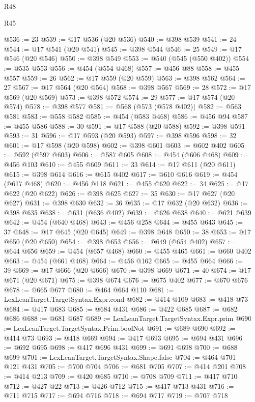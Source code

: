 \begin{lexlean}{R48}
\begin{lexlean}{R45}
\begin{coremodule}
{{{{{{{{{{{{{{{{{{{{{{{{{{{{{{{{{{{{{{{{{{{{{{{{{{{{{{{{{{{{{{{{{{{{{{{{{{{{{{{{{{{{{{{{{{{@536 := 23
@539 := @17 @536 (@20 @536)
@540 := @398 @539
@541 := 24
@544 := @17 @541 (@20 @541)
@545 := @398 @544
@546 := 25
@549 := @17 @546 (@20 @546)
@550 := @398 @549
@553 := @540 (@545 (@550 @402))
@554 := @535 @553
@556 := @454 (@554 @468)
@557 := @456 @88
@558 := @455 @557
@559 := 26
@562 := @17 @559 (@20 @559)
@563 := @398 @562
@564 := 27
@567 := @17 @564 (@20 @564)
@568 := @398 @567
@569 := 28
@572 := @17 @569 (@20 @569)
@573 := @398 @572
@574 := 29
@577 := @17 @574 (@20 @574)
@578 := @398 @577
@581 := @568 (@573 (@578 @402))
@582 := @563 @581
@583 := @558 @582
@585 := @454 (@583 @468)
@586 := @456 @94
@587 := @455 @586
@588 := 30
@591 := @17 @588 (@20 @588)
@592 := @398 @591
@593 := 31
@596 := @17 @593 (@20 @593)
@597 := @398 @596
@598 := 32
@601 := @17 @598 (@20 @598)
@602 := @398 @601
@603 := @602 @402
@605 := @592 (@597 @603)
@606 := @587 @605
@608 := @454 (@606 @468)
@609 := @456 @103
@610 := @455 @609
@611 := 33
@614 := @17 @611 (@20 @611)
@615 := @398 @614
@616 := @615 @402
@617 := @610 @616
@619 := @454 (@617 @468)
@620 := @456 @118
@621 := @455 @620
@622 := 34
@625 := @17 @622 (@20 @622)
@626 := @398 @625
@627 := 35
@630 := @17 @627 (@20 @627)
@631 := @398 @630
@632 := 36
@635 := @17 @632 (@20 @632)
@636 := @398 @635
@638 := @631 (@636 @402)
@639 := @626 @638
@640 := @621 @639
@642 := @454 (@640 @468)
@643 := @456 @258
@644 := @455 @643
@645 := 37
@648 := @17 @645 (@20 @645)
@649 := @398 @648
@650 := 38
@653 := @17 @650 (@20 @650)
@654 := @398 @653
@656 := @649 (@654 @402)
@657 := @644 @656
@659 := @454 (@657 @468)
@660 := @455 @465
@661 := @660 @402
@663 := @454 (@661 @468)
@664 := @456 @162
@665 := @455 @664
@666 := 39
@669 := @17 @666 (@20 @666)
@670 := @398 @669
@671 := 40
@674 := @17 @671 (@20 @671)
@675 := @398 @674
@676 := @675 @402
@677 := @670 @676
@678 := @665 @677
@680 := @464 @664 @110
@681 := LexLeanTarget.TargetSyntax.Expr.cond
@682 := @414 @109
@683 := @418 @73
@684 := @417 @683
@685 := @684 @431
@686 := @422 @685
@687 := @682 @686
@688 := @681 @687
@689 := LexLeanTarget.TargetSyntax.Expr.prim
@690 := LexLeanTarget.TargetSyntax.Prim.boolNot
@691 := @689 @690
@692 := @414 @73
@693 := @418 @669
@694 := @417 @693
@695 := @694 @431
@696 := @692 @695
@698 := @417 @696 @431
@699 := @691 @698
@700 := @688 @699
@701 := LexLeanTarget.TargetSyntax.Shape.false
@704 := @464 @701 @121 @431
@705 := @700 @704
@706 := @681 @705
@707 := @414 @201
@708 := @414 @213
@709 := @420 @685
@710 := @708 @709
@711 := @417 @710
@712 := @427 @22
@713 := @426 @712
@715 := @417 @713 @431
@716 := @711 @715
@717 := @694 @716
@718 := @694 @717
@719 := @707 @718
}}}}}}}}}}}}}}}}}}}}}}}}}}}}}}}}}}}}}}}}}}}}}}}}}}}}}}}}}}}}}}}}}}}}}}}}}}}}}}}}}}}}}}}}}}}
\end{coremodule}
\end{lexlean}
\end{lexlean}
